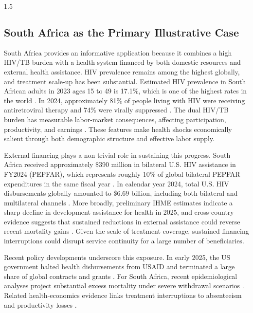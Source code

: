 \documentclass[letterpaper,12pt]{article}
\theoremstyle{definition}
\begin{document}
\begin{spacing}{1.5}
  \subsection{South Africa as the Primary Illustrative Case}

  South Africa provides an informative application because it combines a high HIV/TB burden with a health system financed by both domestic resources and external health assistance. HIV prevalence remains among the highest globally, and treatment scale-up has been substantial. Estimated HIV prevalence in South African adults in 2023 ages 15 to 49 is 17.1\%, which is one of the highest rates in the world \citep{CDC2026}. In 2024, approximately 81\% of people living with HIV were receiving antiretroviral therapy and 74\% were virally suppressed \citep{unaidsdatabook2025}. The dual HIV/TB burden has measurable labor-market consequences, affecting participation, productivity, and earnings \citep{ILO2018}. These features make health shocks economically salient through both demographic structure and effective labor supply.

  External financing plays a non-trivial role in sustaining this progress. South Africa received approximately \$390 million in bilateral U.S. HIV assistance in FY2024 (PEPFAR), which represents roughly 10\% of global bilateral PEPFAR expenditures in the same fiscal year \citep{PEPFAR2024Expenditures}. In calendar year 2024, total U.S. HIV disbursements globally amounted to \$6.69 billion, including both bilateral and multilateral channels \citep{KFF2024HIVDonorFunding}. More broadly, preliminary IHME estimates indicate a sharp decline in development assistance for health in 2025, and cross-country evidence suggests that sustained reductions in external assistance could reverse recent mortality gains \citep{FGH2025,silvaImpactTwoDecades2026}. Given the scale of treatment coverage, sustained financing interruptions could disrupt service continuity for a large number of beneficiaries.

  Recent policy developments underscore this exposure. In early 2025, the US government halted health disbursements from USAID and terminated a large share of global contracts and grants \citep{Cohen2025}. For South Africa, recent epidemiological analyses project substantial excess mortality under severe withdrawal scenarios \citep{Brink2025,Gandhi2025,KS2025}. Related health-economics evidence links treatment interruptions to absenteeism and productivity losses \citep{Keogh2024,Panda2024}.


\end{spacing}
\end{document}
